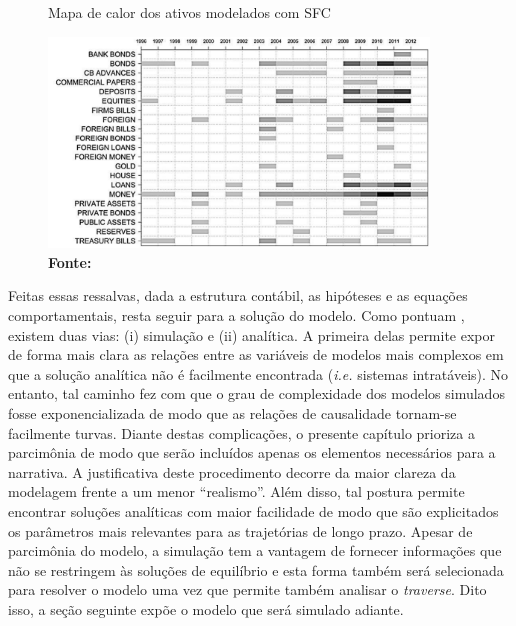 \begin{figure}[H]
	\centering
	\caption{Mapa de calor dos ativos modelados com SFC}
	\label{Heatmap}
	\includegraphics[width = 0.9\textwidth]{Modelo/Caverzassi_Heatmap.png}
	\caption*{\textbf{Fonte:} \textcite[p.~4]{caverzasi_stock-flow_2013}}
\end{figure}






Feitas essas ressalvas, dada a estrutura contábil, as hipóteses e as equações comportamentais, resta seguir para a solução do modelo. Como pontuam \textcite{caverzasi_stock-flow_2013}, existem duas vias: (i) simulação e (ii) analítica. A primeira delas permite expor de forma mais clara as relações entre as variáveis de modelos mais complexos em que a solução analítica não é facilmente encontrada (\textit{i.e.} sistemas intratáveis). No entanto, tal caminho fez com que o grau de complexidade dos modelos simulados fosse exponencializada de modo que as relações de causalidade tornam-se facilmente turvas. Diante destas complicações, o presente capítulo prioriza a parcimônia de modo que serão incluídos apenas os elementos necessários para a narrativa. A justificativa deste procedimento decorre da maior clareza da modelagem frente a um menor ``realismo''.
Além disso, tal postura permite encontrar soluções analíticas com maior facilidade de modo que são explicitados os parâmetros mais relevantes para as trajetórias de longo prazo. Apesar de parcimônia do modelo, a simulação tem a vantagem
de fornecer informações que não se restringem às soluções de equilíbrio e esta forma
também será selecionada para resolver o modelo uma vez que permite também analisar o \textit{traverse}.
Dito isso, a seção seguinte expõe o modelo que será simulado adiante.
